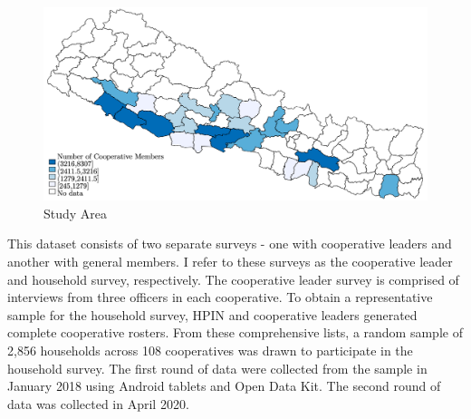\documentclass[11pt]{article}
\begin{document}
\begin{figure}[!h]
    \caption{Study Area}
    \label{map}
    \noindent \centering \includegraphics[width=.9\textwidth,trim=4 4 4 4,clip]{StudyMap.png}
\end{figure}

This dataset consists of two separate surveys - one with cooperative leaders and another with general members.  I refer to these surveys as the cooperative leader and household survey, respectively. The cooperative leader survey is comprised of interviews from three officers in each cooperative. To obtain a representative sample for the household survey, HPIN and cooperative leaders generated complete cooperative rosters. From these comprehensive lists, a random sample of 2,856 households across 108 cooperatives was drawn to participate in the household survey. The first round of data were collected from the sample in January 2018 using Android tablets and Open Data Kit. The second round of data was collected in April 2020.
\end{document}
